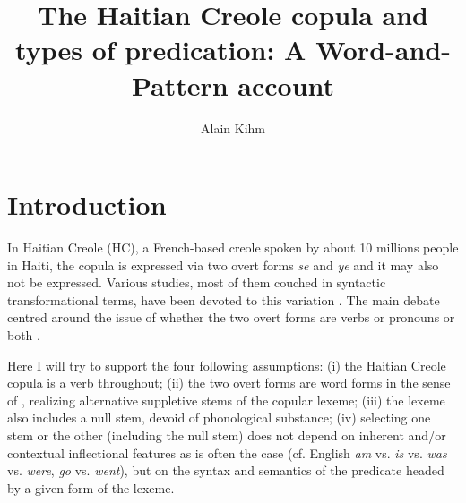\documentclass[output=paper]{langsci/langscibook}
\title{The Haitian Creole copula and types of predication: A Word-and-Pattern account}
\author{Alain Kihm   \affiliation{CNRS, Université Paris-Diderot} }
\begin{document}

\section{Introduction}

In Haitian Creole (HC), a French-based creole spoken by about 10 millions
people in Haiti, the copula is expressed via two overt forms \emph{se}
and \emph{ye} and it may also not be expressed. Various studies, most of
them couched in syntactic transformational terms, have been devoted to
this variation %
\citep{Valdman78,Damoiseau1985,Degraff1992,Kihm93,DeprezVinet1997,Deprez2003}%
%
. The main debate centred around the
issue of whether the two overt forms are verbs %
\citep[e.g.][]{Valdman78,Kihm93} %
%
or pronouns %
\citep{Degraff1992} %
%
or both %
\citep{Deprez2003}%
%
.

Here I will try to support the four following assumptions: (i) the
Haitian Creole copula is a verb throughout; (ii) the two overt forms are
word forms in the sense of %
\citet{Matthews72}, %
%
realizing alternative
suppletive stems of the copular lexeme; (iii) the lexeme also includes a
null stem, devoid of phonological substance; (iv) selecting one stem or
the other (including the null stem) does not depend on inherent and/or
contextual inflectional features as is often the case (cf. English
\emph{am} vs. \emph{is} vs. \emph{was} vs. \emph{were}, \emph{go} vs.
\emph{went}), but on the syntax and semantics of the predicate headed by
a given form of the lexeme.
\end{document}
